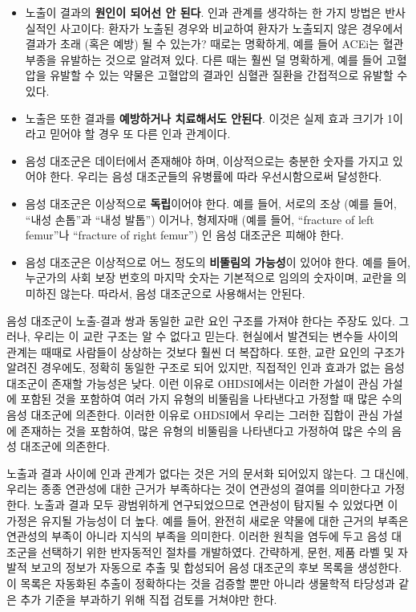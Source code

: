 \documentclass[11pt]{book}
\providecommand{\tightlist}{%
  \setlength{\itemsep}{0pt}\setlength{\parskip}{0pt}}
\theoremstyle{definition}
\theoremstyle{definition}
\theoremstyle{definition}
\theoremstyle{remark}
\begin{document}
\begin{itemize}
\tightlist
\item
  노출이 결과의 \textbf{원인이 되어선 안 된다}. 인과 관계를 생각하는 한
  가지 방법은 반사실적인 사고이다: 환자가 노출된 경우와 비교하여 환자가
  노출되지 않은 경우에서 결과가 초래 (혹은 예방) 될 수 있는가? 때로는
  명확하게, 예를 들어 ACEi는 혈관 부종을 유발하는 것으로 알려져 있다.
  다른 때는 훨씬 덜 명확하게, 예를 들어 고혈압을 유발할 수 있는 약물은
  고혈압의 결과인 심혈관 질환을 간접적으로 유발할 수 있다.
\item
  노출은 또한 결과를 \textbf{예방하거나 치료해서도 안된다}. 이것은 실제
  효과 크기가 1이라고 믿어야 할 경우 또 다른 인과 관계이다.
\item
  음성 대조군은 데이터에서 존재해야 하며, 이상적으로는 충분한 숫자를
  가지고 있어야 한다. 우리는 음성 대조군들의 유병률에 따라
  우선시함으로써 달성한다.
\item
  음성 대조군은 이상적으로 \textbf{독립}이어야 한다. 예를 들어, 서로의
  조상 (예를 들어, ``내성 손톱''과 ``내성 발톱'') 이거나, 형제자매 (예를
  들어, ``fracture of left femur''나 ``fracture of right femur'') 인
  음성 대조군은 피해야 한다.
\item
  음성 대조군은 이상적으로 어느 정도의 \textbf{비뚤림의 가능성}이 있어야
  한다. 예를 들어, 누군가의 사회 보장 번호의 마지막 숫자는 기본적으로
  임의의 숫자이며, 교란을 의미하진 않는다. 따라서, 음성 대조군으로
  사용해서는 안된다.
\end{itemize}

음성 대조군이 노출-결과 쌍과 동일한 교란 요인 구조를 가져야 한다는
주장도 있다. \citep{lipsitch_2010} 그러나, 우리는 이 교란 구조는 알 수
없다고 믿는다. 현실에서 발견되는 변수들 사이의 관계는 때때로 사람들이
상상하는 것보다 훨씬 더 복잡하다. 또한, 교란 요인의 구조가 알려진
경우에도, 정확히 동일한 구조로 되어 있지만, 직접적인 인과 효과가 없는
음성 대조군이 존재할 가능성은 낮다. 이런 이유로 OHDSI에서는 이러한
가설이 관심 가설에 포함된 것을 포함하여 여러 가지 유형의 비뚤림을
나타낸다고 가정할 때 많은 수의 음성 대조군에 의존한다. 이러한 이유로
OHDSI에서 우리는 그러한 집합이 관심 가설에 존재하는 것을 포함하여, 많은
유형의 비뚤림을 나타낸다고 가정하여 많은 수의 음성 대조군에 의존한다.

노출과 결과 사이에 인과 관계가 없다는 것은 거의 문서화 되어있지 않는다.
그 대신에, 우리는 종종 연관성에 대한 근거가 부족하다는 것이 연관성의
결여를 의미한다고 가정한다. 노출과 결과 모두 광범위하게 연구되었으므로
연관성이 탐지될 수 있었다면 이 가정은 유지될 가능성이 더 높다. 예를
들어, 완전히 새로운 약물에 대한 근거의 부족은 연관성의 부족이 아니라
지식의 부족을 의미한다. 이러한 원칙을 염두에 두고 음성 대조군을 선택하기
위한 반자동적인 절차를 개발하였다. \citep{voss_2016} 간략하게, 문헌,
제품 라벨 및 자발적 보고의 정보가 자동으로 추출 및 합성되어 음성
대조군의 후보 목록을 생성한다. 이 목록은 자동화된 추출이 정확하다는 것을
검증할 뿐만 아니라 생물학적 타당성과 같은 추가 기준을 부과하기 위해 직접
검토를 거쳐야만 한다.
\end{document}
